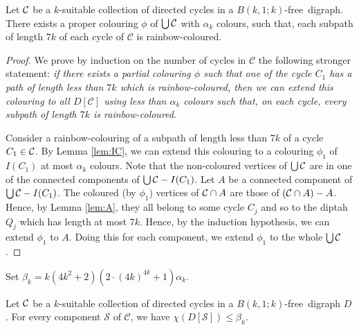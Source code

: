 \documentclass{endm}
\begin{document}
\begin{lemma}\label{lem:col-union-cycle}
Let ${\cal C}$ be a $k$-suitable collection of directed cycles in a $B(k,1;k)$-free\ digraph.
There exists a proper colouring $\phi$ of $\bigcup{\cal C}$ with $\alpha_k$ colours, such that, each subpath of length $7k$ of each cycle of $\mathcal{C}$ is rainbow-coloured.
\end{lemma}
\begin{proof}
We prove by induction on the number of cycles in $\mathcal{C}$ the following stronger statement:
{\it if there exists
a partial colouring $\phi$ such that one of the cycle $C_1$ has a path of length less than $7k$
which is rainbow-coloured, then we can extend this colouring to all $D[\mathcal{C}]$ using less
than $\alpha_k$ colours such that, on each cycle, every subpath of length
$7k$ is rainbow-coloured}.

Consider a rainbow-colouring of a subpath of length less than $7k$ of a cycle $C_1\in {\cal C}$.
By Lemma \ref{lem:IC}, we can extend this colouring to a colouring $\phi_1$ of $I(C_1)$ at most $\alpha_k$ colours.
Note that the non-coloured vertices of $\bigcup{\cal C}$ are in one of the connected components of $\bigcup{\cal C} - I(C_1)$.
Let $A$ be a connected component of $\bigcup{\cal C} - I(C_1)$. The coloured (by $\phi_1$) vertices of ${\cal C}\cap A$ are those of $({\cal C}\cap A)-A$. Hence, by Lemma \ref{lem:A}, they all belong to some cycle $C_j$ and so to the diptah $Q_j$ which has length at most $7k$.
Hence, by the induction hypothesis, we can extend $\phi_1$ to $A$. Doing this for each component, we extend $\phi_1$ to the whole $\bigcup{\cal C}$.
\end{proof}



Set $\beta_k= k(4k^2+2)(2\cdot (4k)^{4k} + 1) \alpha_k$.

\begin{lemma}\label{lem:DC}
Let ${\cal C}$ be a $k$-suitable collection of directed cycles in a $B(k,1;k)$-free\ digraph $D$.
For every component $\mathcal{S}$ of $\mathcal{C}$, we have $\chi(D[\mathcal{S}]) \leq \beta_k$.
\end{lemma}
\end{document}

